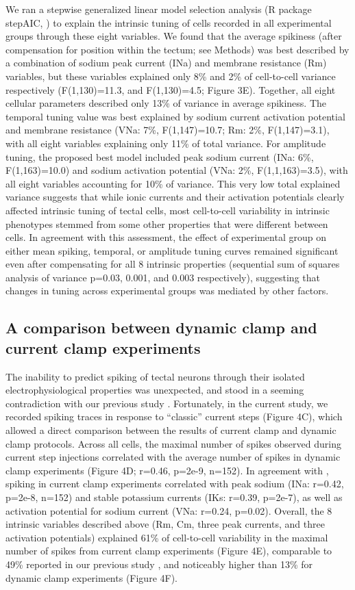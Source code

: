 \documentclass{article}
\begin{document}
We ran a stepwise generalized linear model selection analysis (R package stepAIC, \citealt{venables2013}) to explain the intrinsic tuning of cells recorded in all experimental groups through these eight variables. We found that the average spikiness (after compensation for position within the tectum; see Methods) was best described by a combination of sodium peak current (INa) and membrane resistance (Rm) variables, but these variables explained only 8\% and 2\% of cell-to-cell variance respectively (F(1,130)=11.3, and F(1,130)=4.5; Figure 3E). Together, all eight cellular parameters described only 13\% of variance in average spikiness. The temporal tuning value was best explained by sodium current activation potential and membrane resistance (VNa: 7\%, F(1,147)=10.7; Rm: 2\%, F(1,147)=3.1), with all eight variables explaining only 11\% of total variance. For amplitude tuning, the proposed best model included peak sodium current (INa: 6\%, F(1,163)=10.0) and sodium activation potential (VNa: 2\%, F(1,1,163)=3.5), with all eight variables accounting for 10\% of variance. This very low total explained variance suggests that while ionic currents and their activation potentials clearly affected intrinsic tuning of tectal cells, most cell-to-cell variability in intrinsic phenotypes stemmed from some other properties that were different between cells. In agreement with this assessment, the effect of experimental group on either mean spiking, temporal, or amplitude tuning curves remained significant even after compensating for all 8 intrinsic properties (sequential sum of squares analysis of variance p=0.03, 0.001, and 0.003 respectively), suggesting that changes in tuning across experimental groups was mediated by other factors.

\subsection*{A comparison between dynamic clamp and current clamp experiments}

The inability to predict spiking of tectal neurons through their isolated electrophysiological properties was unexpected, and stood in a seeming contradiction with our previous study \citep{ciarleglio2015}. Fortunately, in the current study, we recorded spiking traces in response to “classic” current steps (Figure 4C), which allowed a direct comparison between the results of current clamp and dynamic clamp protocols. Across all cells, the maximal number of spikes observed during current step injections correlated with the average number of spikes in dynamic clamp experiments (Figure 4D; r=0.46, p=2e-9, n=152). In agreement with \citep{ciarleglio2015}, spiking in current clamp experiments correlated with peak sodium (INa: r=0.42, p=2e-8, n=152) and stable potassium currents (IKs: r=0.39, p=2e-7), as well as activation potential for sodium current (VNa: r=0.24, p=0.02). Overall, the 8 intrinsic variables described above (Rm, Cm, three peak currents, and three activation potentials) explained 61\% of cell-to-cell variability in the maximal number of spikes from current clamp experiments (Figure 4E), comparable to 49\% reported in our previous study \citep{ciarleglio2015}, and noticeably higher than 13\% for dynamic clamp experiments (Figure 4F).
\end{document}
